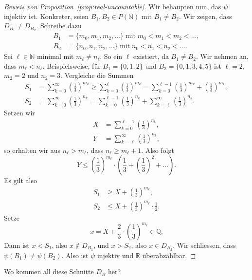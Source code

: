 \documentclass[../main.tex]{subfiles}
\begin{document}
\begin{proof}[Beweis von Proposition~\ref{prop:real-uncountable}]
Wir behaupten nun, das $\psi$ injektiv ist. Konkreter, seien
$B_{1}, B_{2} \in P(\mathbb N)$ mit $B_{1} \neq B_{2}$.
Wir zeigen, dass $D_{B_{1}} \neq D_{B_{2}}$.
Schreibe dazu
\begin{align*}
  B_{1} &= \{m_{0}, m_{1}, m_{2}, \dots\} \;\text{mit}\; m_{0} < m_{1} < m_{2} < \dots, \\
  B_{2} &= \{n_{0}, n_{1}, n_{2}, \dots\} \;\text{mit}\; n_{0} < n_{1} < n_{2} < \dots.
\end{align*}
Sei $\ell \in \mathbb N$ minimal mit $m_{\ell} \neq n_{\ell}$. So ein $\ell$
existiert, da $B_{1} \neq B_{2}$. Wir nehmen an, dass $m_{\ell} < n_{\ell}$.
Beispielsweise, für $B_{1} = \{0, 1, 2\}$ und $B_{2} = \{0, 1, 3, 4, 5\}$ ist
$\ell = 2$, $m_{2} = 2$ und $n_{2} = 3$.
Vergleiche die Summen
\begin{align*}
  S_{1} &= \sum_{k=0}^{\infty} {\left(\frac{1}{3}\right)}^{m_{k}}
          \geq \sum_{k=0}^{\ell} {\left(\frac{1}{3}\right)}^{m_{k}}
          = \sum_{k=0}^{\ell-1} {\left(\frac{1}{3}\right)}^{m_{k}} + {\left(\frac{1}{3}\right)}^{m_{\ell}}, \\
  S_{2} &= \sum_{k=0}^{\infty}{\left(\frac{1}{3}\right)}^{n_{k}}
          = \sum_{k=0}^{\ell - 1} {\left(\frac{1}{3}\right)}^{n_{k}}
          + \sum_{k= \ell}^{\infty} {\left(\frac{1}{3}\right)}^{n_{k}}.
\end{align*}
Setzen wir
\begin{align*}
  X &= \sum_{k=0}^{\ell - 1}{\left(\frac{1}{3}\right)}^{n_{k}}, \\
  Y &= \sum_{k= \ell}^{\infty} {\left(\frac{1}{3}\right)}^{n_{k}},
\end{align*}
so erhalten wir aus $n_{\ell} > m_{\ell}$, dass $n_{\ell} \geq m_{\ell} + 1$.
Also folgt
\[Y \leq {\left(\frac{1}{3}\right)}^{m_{\ell}} \cdot \left(
    \frac{1}{3} + {\left( \frac{1}{3}\right)}^{2} + \dots
    \right).\]
Es gilt also
\begin{align*}
  S_{1} & \geq X + {\left(\frac{1}{3}\right)}^{m_{\ell}}, \\
  S_{2} & \leq X + {\left(\frac{1}{3}\right)}^{m_{\ell}}\cdot \frac{1}{2}.
\end{align*}
Setze
\[x = X + \frac{2}{3}\cdot {\left(\frac{1}{3}\right)}^{m_{\ell}} \in \mathbb Q.\]
Dann ist $x < S_{1}$, also $x \notin D_{B_{1}}$, und $x > S_{2}$, also
$x \in D_{B_{2}}$. Wir schliessen, dass $\psi(B_{1}) \neq \psi(B_{2})$.
Also ist $\psi$ injektiv und $\mathbb R$ überabzählbar.
\end{proof}

\begin{question}
  Wo kommen all diese Schnitte $D_{B}$ her?
\end{question}
\end{document}
